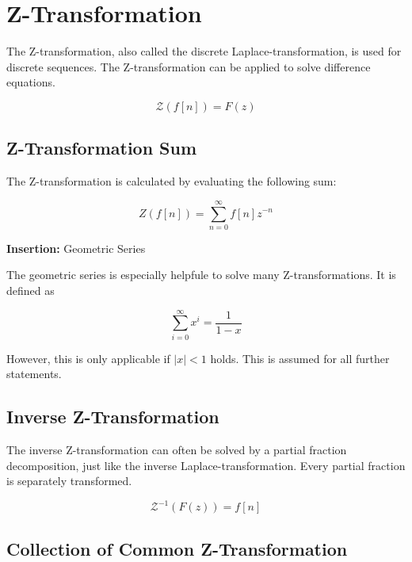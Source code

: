 \documentclass[./\jobname.tex]{subfiles}
\begin{document}
\chapter{Z-Transformation}

The Z-transformation, also called the discrete Laplace-transformation, is used for discrete sequences. The Z-transformation can be applied to solve difference equations. 

\begin{equation}
	\mathcal{Z} \left( f\left[ n \right] \right) = F(z)
\end{equation}

\section{Z-Transformation Sum}

The Z-transformation is calculated by evaluating the following sum:

\begin{equation}
	Z(f[n]) = \sum_{n=0}^{\infty} f[n] z^{-n}
\end{equation}

\textbf{Insertion: } Geometric Series

The geometric series is especially helpfule to solve many Z-transformations. It is defined as 

\begin{equation}
	\sum_{i=0}^{\infty} x^i = \frac{1}{1-x}
\end{equation}

However, this is only applicable if $|x| < 1$ holds. This is assumed for all further statements. 

\section{Inverse Z-Transformation}

The inverse Z-transformation can often be solved by a partial fraction decomposition, just like the inverse Laplace-transformation. Every partial fraction is separately transformed. 

\begin{equation}
	\mathcal{Z}^{-1}\left( F(z) \right) = f[n]
\end{equation}


\section{Collection of Common Z-Transformation}
\end{document}
